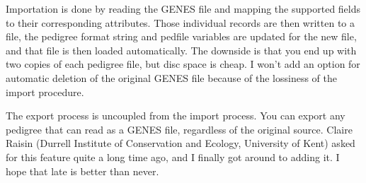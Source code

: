 Importation is done by reading the GENES file and mapping the supported fields to their corresponding \PyPedal{}
attributes. Those individual records are then written to a file, the pedigree format string and pedfile variables are
updated for the new file, and that file is then loaded automatically. The downside is that you end up with two copies
of each pedigree file, but disc space is cheap. I won't add an option for automatic deletion of the original GENES file
because of the lossiness of the import procedure.

The export process is uncoupled from the import process. You can export any pedigree that \PyPedal{} can read as a
GENES file, regardless of the original source. Claire Raisin (Durrell Institute of Conservation and Ecology, University
of Kent) asked for this feature quite a long time ago, and I finally got around to adding it. I hope that late is better than
never.
